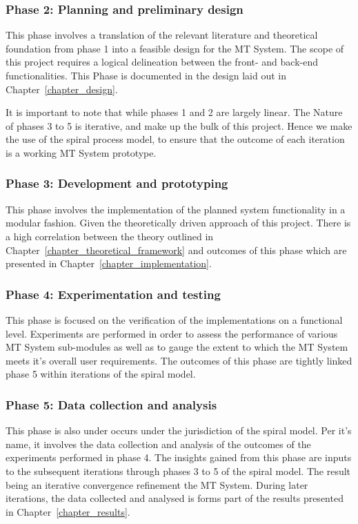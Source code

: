 \subsubsection{Phase 2: Planning and preliminary design}
This phase involves a translation of the relevant literature and theoretical
foundation from phase 1 into a feasible design for the MT System. The scope of
this project requires a logical delineation between the front- and back-end
functionalities. This Phase is documented in the design laid out in
Chapter~\ref{chapter_design}.

It is important to note that while phases 1 and 2 are largely linear. The Nature
of phases 3 to 5 is iterative, and make up the bulk of this project. Hence we
make the use of the spiral process model, to ensure that the outcome of each iteration
is a working MT System prototype.  

\subsubsection{Phase 3: Development and prototyping}
This phase involves the implementation of the planned system functionality in a
modular fashion. Given the theoretically driven approach of this project. There
is a high correlation between the theory outlined in
Chapter~\ref{chapter_theoretical_framework} and outcomes of this phase which are
presented in Chapter~\ref{chapter_implementation}.

\subsubsection{Phase 4: Experimentation and testing}
This phase is focused on the verification of the implementations on a
functional level. Experiments are performed in order to
assess the performance of various MT System sub-modules as well as to gauge the
extent to which the MT System meets it's overall user requirements. The
outcomes of this phase are tightly linked phase 5 within iterations of the
spiral model. 

\subsubsection{Phase 5: Data collection and analysis}
This phase is also under occurs under the jurisdiction of the spiral model. Per
it's name, it involves the data collection and analysis of the outcomes of the
experiments performed in phase 4. The insights gained from this phase are inputs
to the subsequent iterations through phases 3 to 5 of the spiral model. The result
being an iterative convergence refinement the MT System. During later
iterations, the data collected and analysed is forms part of the results
presented in Chapter~\ref{chapter_results}.

